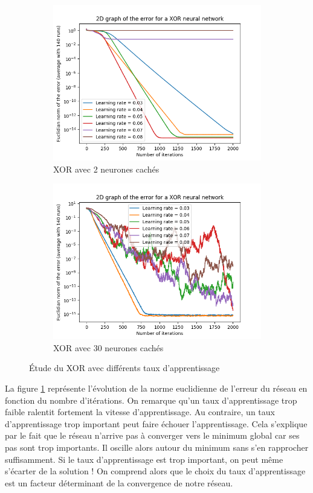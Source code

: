 \begin{figure}[h]
 \centering
 \begin{subfigure}{0.5\textwidth}
  \centering
  \includegraphics[width=0.6\linewidth]{img/XOR2D.png}
  \caption{XOR avec 2 neurones cachés}
  \label{fig:xor2D-2}
 \end{subfigure}
 \begin{subfigure}{0.4\textwidth}
  \centering
  \includegraphics[width=0.8\linewidth]{img/XOR30.png}
  \caption{XOR avec 30 neurones cachés}
  \label{fig:xor2D-30}
 \end{subfigure}
 \caption{Étude du XOR avec différents taux d'apprentissage}
 \label{fig:xor2D}
\end{figure}
 
La figure \ref{fig:xor2D-2} représente l'évolution de la norme euclidienne de l'erreur du réseau en fonction du nombre d'itérations. On remarque qu'un taux d'apprentissage trop faible ralentit fortement la vitesse d'apprentissage. Au contraire, un taux d'apprentissage trop important peut faire échouer l'apprentissage.
Cela s'explique par le fait que le réseau n'arrive pas à converger vers le minimum global car ses pas sont trop importants. Il oscille alors autour du minimum sans s'en rapprocher suffisamment. Si le taux d'apprentissage est trop important, on peut même s'écarter de la solution ! On comprend alors que le choix du taux d'apprentissage est un facteur déterminant de la convergence de notre réseau.

